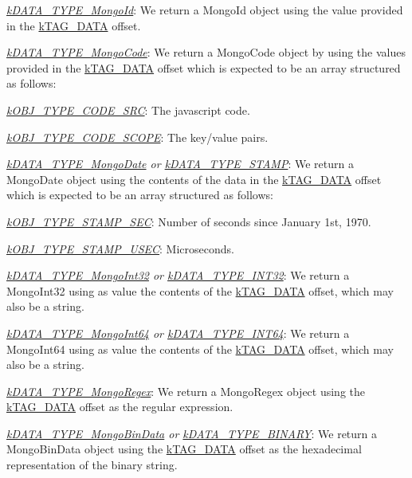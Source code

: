 \begin{DoxyItemize}
\item {\itshape \hyperlink{}{k\-D\-A\-T\-A\-\_\-\-T\-Y\-P\-E\-\_\-\-Mongo\-Id}\/}\-: We return a Mongo\-Id object using the value provided in the \hyperlink{}{k\-T\-A\-G\-\_\-\-D\-A\-T\-A} offset. 
\item {\itshape \hyperlink{}{k\-D\-A\-T\-A\-\_\-\-T\-Y\-P\-E\-\_\-\-Mongo\-Code}\/}\-: We return a Mongo\-Code object by using the values provided in the \hyperlink{}{k\-T\-A\-G\-\_\-\-D\-A\-T\-A} offset which is expected to be an array structured as follows\-: 
\begin{DoxyItemize}
\item {\itshape \hyperlink{}{k\-O\-B\-J\-\_\-\-T\-Y\-P\-E\-\_\-\-C\-O\-D\-E\-\_\-\-S\-R\-C}\/}\-: The javascript code. 
\item {\itshape \hyperlink{}{k\-O\-B\-J\-\_\-\-T\-Y\-P\-E\-\_\-\-C\-O\-D\-E\-\_\-\-S\-C\-O\-P\-E}\/}\-: The key/value pairs. 
\end{DoxyItemize}
\item {\itshape \hyperlink{}{k\-D\-A\-T\-A\-\_\-\-T\-Y\-P\-E\-\_\-\-Mongo\-Date} or \hyperlink{}{k\-D\-A\-T\-A\-\_\-\-T\-Y\-P\-E\-\_\-\-S\-T\-A\-M\-P}\/}\-: We return a Mongo\-Date object using the contents of the data in the \hyperlink{}{k\-T\-A\-G\-\_\-\-D\-A\-T\-A} offset which is expected to be an array structured as follows\-: 
\begin{DoxyItemize}
\item {\itshape \hyperlink{}{k\-O\-B\-J\-\_\-\-T\-Y\-P\-E\-\_\-\-S\-T\-A\-M\-P\-\_\-\-S\-E\-C}\/}\-: Number of seconds since January 1st, 1970. 
\item {\itshape \hyperlink{}{k\-O\-B\-J\-\_\-\-T\-Y\-P\-E\-\_\-\-S\-T\-A\-M\-P\-\_\-\-U\-S\-E\-C}\/}\-: Microseconds. 
\end{DoxyItemize}
\item {\itshape \hyperlink{}{k\-D\-A\-T\-A\-\_\-\-T\-Y\-P\-E\-\_\-\-Mongo\-Int32} or \hyperlink{}{k\-D\-A\-T\-A\-\_\-\-T\-Y\-P\-E\-\_\-\-I\-N\-T32}\/}\-: We return a Mongo\-Int32 using as value the contents of the \hyperlink{}{k\-T\-A\-G\-\_\-\-D\-A\-T\-A} offset, which may also be a string. 
\item {\itshape \hyperlink{}{k\-D\-A\-T\-A\-\_\-\-T\-Y\-P\-E\-\_\-\-Mongo\-Int64} or \hyperlink{}{k\-D\-A\-T\-A\-\_\-\-T\-Y\-P\-E\-\_\-\-I\-N\-T64}\/}\-: We return a Mongo\-Int64 using as value the contents of the \hyperlink{}{k\-T\-A\-G\-\_\-\-D\-A\-T\-A} offset, which may also be a string. 
\item {\itshape \hyperlink{}{k\-D\-A\-T\-A\-\_\-\-T\-Y\-P\-E\-\_\-\-Mongo\-Regex}\/}\-: We return a Mongo\-Regex object using the \hyperlink{}{k\-T\-A\-G\-\_\-\-D\-A\-T\-A} offset as the regular expression. 
\item {\itshape \hyperlink{}{k\-D\-A\-T\-A\-\_\-\-T\-Y\-P\-E\-\_\-\-Mongo\-Bin\-Data} or \hyperlink{}{k\-D\-A\-T\-A\-\_\-\-T\-Y\-P\-E\-\_\-\-B\-I\-N\-A\-R\-Y}\/}\-: We return a Mongo\-Bin\-Data object using the \hyperlink{}{k\-T\-A\-G\-\_\-\-D\-A\-T\-A} offset as the hexadecimal representation of the binary string. 
\end{DoxyItemize}


